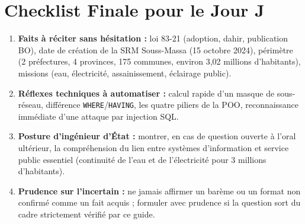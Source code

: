 \section{Checklist Finale pour le Jour J}
\begin{enumerate}
    \item \textbf{Faits à réciter sans hésitation :} loi 83-21 (adoption, dahir, publication BO), date de création de la SRM Souss-Massa (15 octobre 2024), périmètre (2 préfectures, 4 provinces, 175 communes, environ 3,02 millions d'habitants), missions (eau, électricité, assainissement, éclairage public).
    \item \textbf{Réflexes techniques à automatiser :} calcul rapide d'un masque de sous-réseau, différence \texttt{WHERE}/\texttt{HAVING}, les quatre piliers de la POO, reconnaissance immédiate d'une attaque par injection SQL.
    \item \textbf{Posture d'ingénieur d'État :} montrer, en cas de question ouverte à l'oral ultérieur, la compréhension du lien entre systèmes d'information et service public essentiel (continuité de l'eau et de l'électricité pour 3 millions d'habitants).
    \item \textbf{Prudence sur l'incertain :} ne jamais affirmer un barème ou un format non confirmé comme un fait acquis ; formuler avec prudence si la question sort du cadre strictement vérifié par ce guide.
\end{enumerate}

